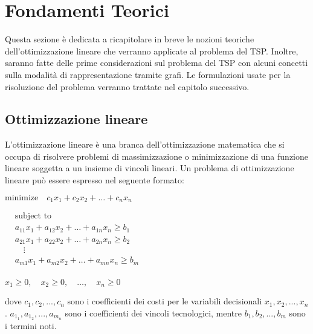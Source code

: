 \chapter{Fondamenti Teorici}\label{fondamenti_teorici}

Questa sezione è dedicata a ricapitolare in breve le nozioni teoriche dell'ottimizzazione lineare che verranno applicate al problema del TSP. Inoltre, saranno fatte delle prime considerazioni sul problema del TSP con alcuni concetti sulla modalità di rappresentazione tramite grafi. Le formulazioni usate per la risoluzione del problema verranno trattate nel capitolo successivo.

\section{Ottimizzazione lineare}

L'ottimizzazione lineare è una branca dell'ottimizzazione matematica che si occupa di risolvere problemi di massimizzazione o minimizzazione di una funzione lineare soggetta a un insieme di vincoli lineari. Un problema di ottimizzazione lineare può essere espresso nel seguente formato:


\begin{math}
\text{minimize} \quad c_1 x_1 + c_2 x_2 + \ldots + c_n x_n
\end{math}

\begin{math}
\begin{aligned}
& \text{subject to} \\
& a_{11} x_1 + a_{12} x_2 + \ldots + a_{1n} x_n \geq b_1 \\
& a_{21} x_1 + a_{22} x_2 + \ldots + a_{2n} x_n \geq b_2 \\
& \quad \vdots \\
& a_{m1} x_1 + a_{m2} x_2 + \ldots + a_{mn} x_n \geq b_m \\
\end{aligned}
\end{math}



\begin{math}
 x_1 \geq 0, \quad x_2 \geq 0, \quad \ldots, \quad x_n \geq 0
\end{math}


dove \begin{math}c_1, c_2, ..., c_n \end{math} 
sono i coefficienti dei costi per le variabili decisionali \begin{math}x_1, x_2, ..., x_n \end{math}. \begin{math}a_{1_1}, a_{1_2}, ..., a_{m_n} \end{math} 
sono i coefficienti dei vincoli tecnologici, mentre 
\begin{math}b_1, b_2, ..., b_m \end{math}
sono i termini noti.

